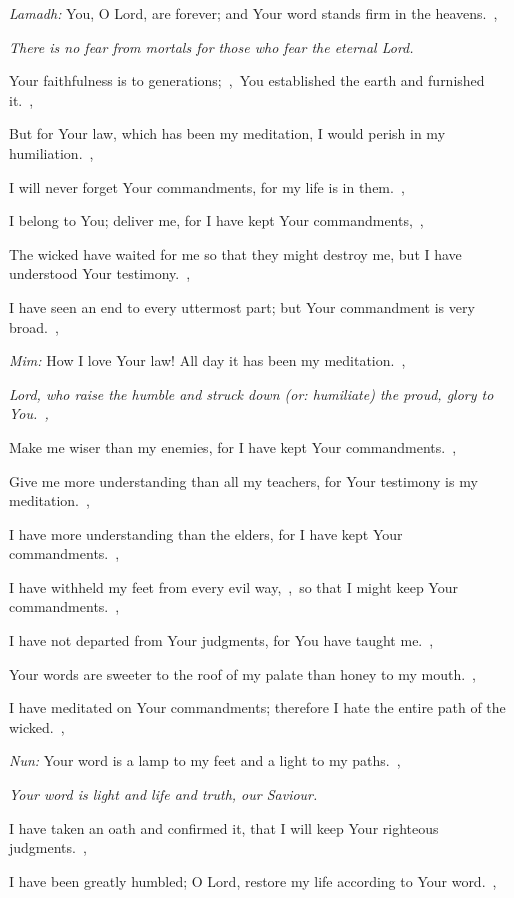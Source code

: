 \documentclass[12pt,twoside,a5paper]{article}
\newcommand{\qanona}[1]{{\liturgicalhint{Qanona.} \emph{#1}}}
\newcommand{\translationoption}[1]{\emph{or:} #1}
\begin{document}
\begin{normalparskip}
  \emph{Lamadh:} You, O Lord, are forever; and Your word stands firm in the heavens.~\sep

  \qanona{There is no fear from mortals for those who fear the eternal Lord.}

  Your faithfulness is to generations;~\sep\ You established the earth and furnished it.~\sep

  But for Your law, which has been my meditation, I would perish in my humiliation.~\sep

  I will never forget Your commandments, for my life is in them.~\sep

  I belong to You; deliver me, for I have kept Your commandments,~\sep

  The wicked have waited for me so that they might destroy me, but I have understood Your testimony.~\sep

  I have seen an end to every uttermost part; but Your commandment is very broad.~\sep

  \emph{Mim:} How I love Your law! All day it has been my meditation.~\sep

  \qanona{Lord, who raise the humble and struck down (\translationoption{humiliate}) the proud, glory to You.~\sep}

  Make me wiser than my enemies, for I have kept Your commandments.~\sep

  Give me more understanding than all my teachers, for Your testimony is my meditation.~\sep

  I have more understanding than the elders, for I have kept Your commandments.~\sep

  I have withheld my feet from every evil way,~\sep\ so that I might keep Your commandments.~\sep

  I have not departed from Your judgments, for You have taught me.~\sep

  Your words are sweeter to the roof of my palate than honey to my mouth.~\sep

  I have meditated on Your commandments; therefore I hate the entire path of the wicked.~\sep

  \emph{Nun:} Your word is a lamp to my feet and a light to my paths.~\sep

  \qanona{Your word is light and life and truth, our Saviour.}

  I have taken an oath and confirmed it, that I will keep Your righteous judgments.~\sep

  I have been greatly humbled; O Lord, restore my life according to Your word.~\sep


\end{normalparskip}
\end{document}
